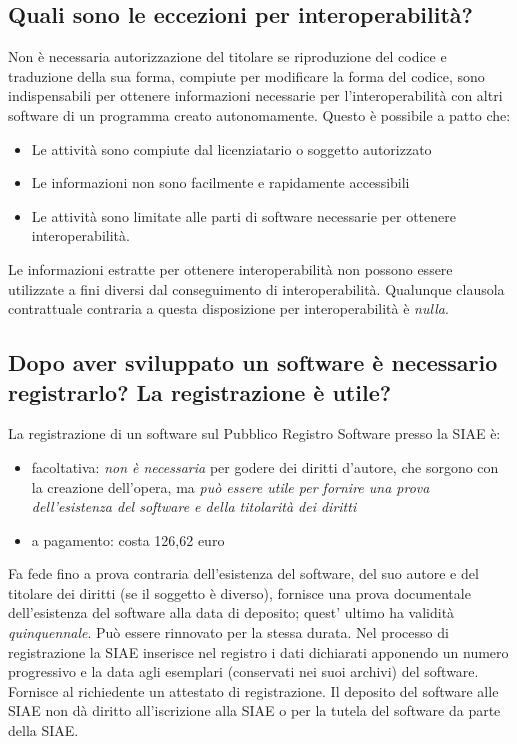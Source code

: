 \subsection{Quali sono le eccezioni per interoperabilità?}
Non è necessaria autorizzazione del titolare se riproduzione del codice e traduzione della sua forma, compiute per modificare la forma del codice, 
sono indispensabili per ottenere informazioni necessarie per l'interoperabilità con altri software di un programma creato
autonomamente. Questo è possibile a patto che:
\begin{itemize}
    \item Le attività sono compiute dal licenziatario o soggetto autorizzato
    \item Le informazioni non sono facilmente e rapidamente accessibili
    \item Le attività sono limitate alle parti di software necessarie per ottenere interoperabilità.
\end{itemize}
Le informazioni estratte per ottenere interoperabilità non possono essere utilizzate a fini diversi dal conseguimento di interoperabilità. Qualunque clausola contrattuale
contraria a questa disposizione per interoperabilità è \emph{nulla}.

\subsection{Dopo aver sviluppato un software è necessario registrarlo? La registrazione è utile?}
La registrazione di un software sul Pubblico Registro Software presso la SIAE è:
\begin{itemize}
    \item facoltativa: \emph{non è necessaria} per godere dei diritti d'autore, che sorgono con la creazione dell'opera,
    ma \emph{può essere utile per fornire una prova dell'esistenza del software e della titolarità dei diritti}
    \item a pagamento: costa 126,62 euro
\end{itemize}
Fa fede fino a prova contraria dell'esistenza del software, del suo autore e del titolare dei diritti (se il soggetto è diverso),
fornisce una prova documentale dell'esistenza del software alla data di deposito; quest' ultimo ha validità \emph{quinquennale}. Può
essere rinnovato per la stessa durata.\newline
Nel processo di registrazione la SIAE inserisce nel registro i dati dichiarati apponendo un numero progressivo e la data agli esemplari (conservati nei suoi archivi)
del software. Fornisce al richiedente un attestato di registrazione.\newline
Il deposito del software alle SIAE non dà diritto all'iscrizione alla SIAE o per la tutela del software
da parte della SIAE.

